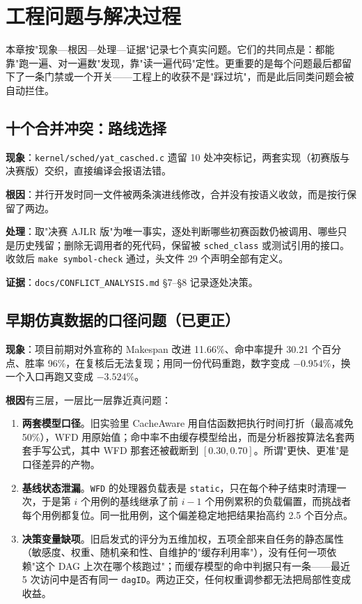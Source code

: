 
\section{工程问题与解决过程} \label{sec:difficulties}

本章按"现象—根因—处理—证据"记录七个真实问题。它们的共同点是：都能靠"跑一遍、对一遍数"发现，靠"读一遍代码"定性。更重要的是每个问题最后都留下了一条门禁或一个开关——工程上的收获不是"踩过坑"，而是此后同类问题会被自动拦住。

\subsection{十个合并冲突：路线选择}

\textbf{现象}：\texttt{kernel/sched/yat\_casched.c} 遗留 10 处冲突标记，两套实现（初赛版与决赛版）交织，直接编译会报语法错。

\textbf{根因}：并行开发时同一文件被两条演进线修改，合并没有按语义收敛，而是按行保留了两边。

\textbf{处理}：取"决赛 AJLR 版"为唯一事实，逐处判断哪些初赛函数仍被调用、哪些只是历史残留；删除无调用者的死代码，保留被 \texttt{sched\_class} 或测试引用的接口。收敛后 \texttt{make symbol-check} 通过，头文件 29 个声明全部有定义。

\textbf{证据}：\texttt{docs/CONFLICT\_ANALYSIS.md} §7--§8 记录逐处决策。

\subsection{早期仿真数据的口径问题（已更正）}

\textbf{现象}：项目前期对外宣称的 Makespan 改进 11.66\%、命中率提升 30.21 个百分点、胜率 96\%，在复核后无法复现；用同一份代码重跑，数字变成 $-0.954\%$，换一个入口再跑又变成 $-3.524\%$。

\textbf{根因}有三层，一层比一层靠近真问题：

\begin{enumerate}
  \item \textbf{两套模型口径}。旧实验里 CacheAware 用自估函数把执行时间打折（最高减免 50\%），WFD 用原始值；命中率不由缓存模型给出，而是分析器按算法名套两套手写公式，其中 WFD 那套还被截断到 $[0.30,0.70]$。所谓"更快、更准"是口径差异的产物。
  \item \textbf{基线状态泄漏}。\texttt{WFD} 的处理器负载表是 \texttt{static}，只在每个种子结束时清理一次，于是第 $i$ 个用例的基线继承了前 $i-1$ 个用例累积的负载偏置，而挑战者每个用例都复位。同一批用例，这个偏差稳定地把结果抬高约 2.5 个百分点。
  \item \textbf{决策变量缺项}。旧启发式的评分为五维加权，五项全部来自任务的静态属性（敏感度、权重、随机亲和性、自维护的"缓存利用率"），没有任何一项依赖"这个 DAG 上次在哪个核跑过"；而缓存模型的命中判据只有一条——最近 5 次访问中是否有同一 \texttt{dagID}。两边正交，任何权重调参都无法把局部性变成收益。
\end{enumerate}


